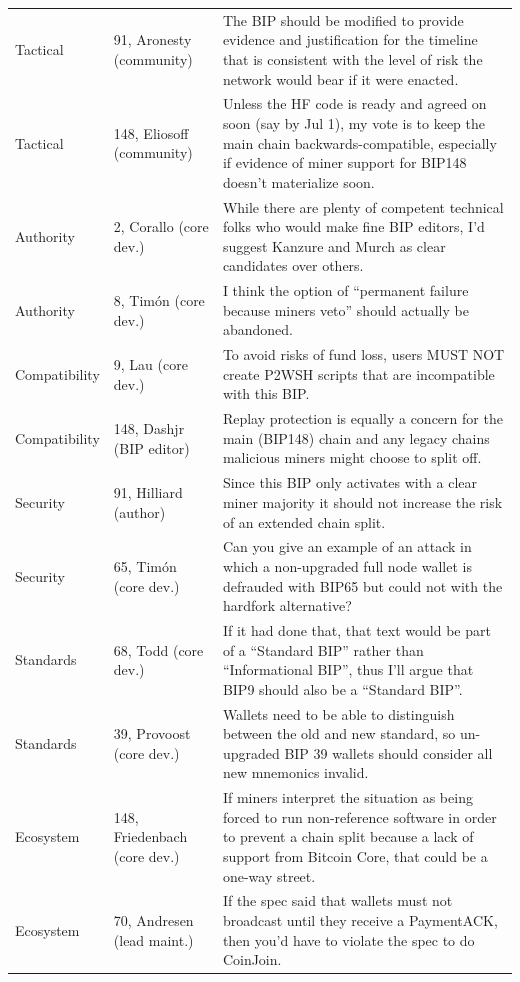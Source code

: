 \begin{table}[t]
\begin{tabular}{p{}p{}p{}}
Tactical & 91, Aronesty (community) & The BIP should be modified to provide evidence and justification for the timeline that is consistent with the level of risk the network would bear if it were enacted. \\
Tactical & 148, Eliosoff (community) & Unless the HF code is ready and agreed on soon (say by Jul 1), my vote is to keep the main chain backwards-compatible, especially if evidence of miner support for BIP148 doesn't materialize soon. \\
Authority & 2, Corallo (core dev.) & While there are plenty of competent technical folks who would make fine BIP editors, I'd suggest Kanzure and Murch as clear candidates over others. \\
Authority & 8, Tim\'on (core dev.) & I think the option of ``permanent failure because miners veto'' should actually be abandoned. \\
Compatibility & 9, Lau (core dev.) & To avoid risks of fund loss, users MUST NOT create P2WSH scripts that are incompatible with this BIP. \\
Compatibility & 148, Dashjr (BIP editor) & Replay protection is equally a concern for the main (BIP148) chain and any legacy chains malicious miners might choose to split off. \\
Security & 91, Hilliard (author) & Since this BIP only activates with a clear miner majority it should not increase the risk of an extended chain split. \\
Security & 65, Tim\'on (core dev.) & Can you give an example of an attack in which a non-upgraded full node wallet is defrauded with BIP65 but could not with the hardfork alternative? \\
Standards & 68, Todd (core dev.) & If it had done that, that text would be part of a ``Standard BIP'' rather than ``Informational BIP'', thus I'll argue that BIP9 should also be a ``Standard BIP''. \\
Standards & 39, Provoost (core dev.) & Wallets need to be able to distinguish between the old and new standard, so un-upgraded BIP 39 wallets should consider all new mnemonics invalid. \\
Ecosystem & 148, Friedenbach (core dev.) & If miners interpret the situation as being forced to run non-reference software in order to prevent a chain split because a lack of support from Bitcoin Core, that could be a one-way street. \\
Ecosystem & 70, Andresen (lead maint.) & If the spec said that wallets must not broadcast until they receive a PaymentACK, then you'd have to violate the spec to do CoinJoin. \\

\end{tabular}
\end{table}
